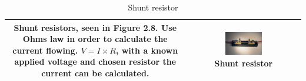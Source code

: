 \begin{table}[H]
\begin{tabular}{|c|c|}
      \hline      
      \begin{minipage}[b]{0.45\textwidth}
          \textbf{Shunt resistors}, seen in Figure 2.8. Use Ohms law in order to calculate the current flowing. $V = I\times R$, with a known applied voltage and chosen resistor the current can be calculated.\newline
      \end{minipage}
         &  
        \begin{minipage}[b]{0.45\textwidth}
            \begin{figure}[H]
              \centering               \includegraphics[width=0.6\textwidth]{shunt_resistor.jpg}
                \caption{Shunt resistor}
                \label{fig:shunt}
            \end{figure}
        \end{minipage}\\
        \hline        


\end{tabular}
\end{table}
